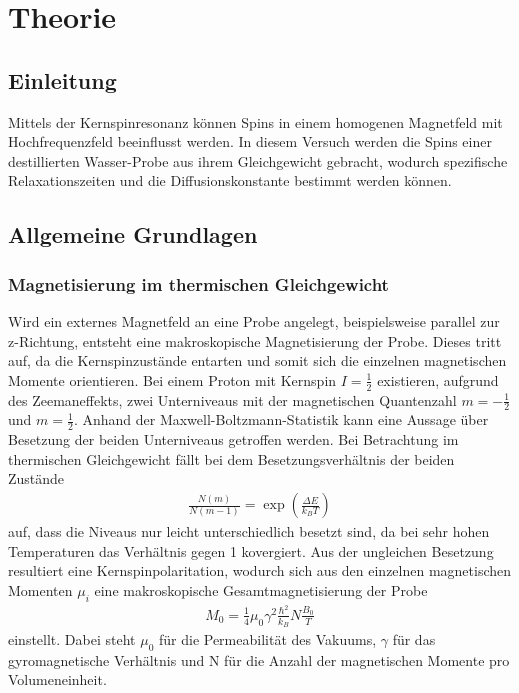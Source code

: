 \section{Theorie}
\label{sec:Theorie}
\subsection{Einleitung}
Mittels der Kernspinresonanz können Spins in einem homogenen Magnetfeld mit
Hochfrequenzfeld beeinflusst werden. In diesem Versuch werden die Spins einer 
destillierten Wasser-Probe aus ihrem Gleichgewicht gebracht, wodurch spezifische
Relaxationszeiten und die Diffusionskonstante bestimmt werden können.

\subsection{Allgemeine Grundlagen}
\subsubsection{Magnetisierung im thermischen Gleichgewicht}
Wird ein externes Magnetfeld an eine Probe angelegt, beispielsweise parallel
zur z-Richtung, entsteht eine makroskopische Magnetisierung der Probe. Dieses
tritt auf, da die Kernspinzustände entarten und somit sich die einzelnen
magnetischen Momente orientieren. Bei einem Proton mit Kernspin $I=\frac{1}{2}$
existieren, aufgrund des Zeemaneffekts, zwei Unterniveaus mit der magnetischen
Quantenzahl $m=-\frac{1}{2}$ und $m=\frac{1}{2}$. Anhand der
Maxwell-Boltzmann-Statistik kann eine Aussage über Besetzung der beiden
Unterniveaus getroffen werden. Bei Betrachtung im thermischen Gleichgewicht
fällt bei dem Besetzungsverhältnis der beiden Zustände
\begin{align}
	\frac{N(m)}{N(m-1)}=\exp{\left(\frac{\Delta E}{k_BT}\right)}
	\label{eq:verhaeltniss}
\end{align}
auf, dass die Niveaus nur leicht unterschiedlich besetzt sind, da bei sehr hohen Temperaturen das Verhältnis gegen 1 kovergiert. Aus der ungleichen Besetzung resultiert eine Kernspinpolaritation, wodurch sich aus den einzelnen magnetischen Momenten $\mu_i$ eine makroskopische Gesamtmagnetisierung der Probe
\begin{align}
	M_0 = \frac{1}{4}\mu_0\gamma^2\frac{\hbar^2}{k_B}N\frac{B_0}{T}
	\label{eq:gleichgewicht}
\end{align}
einstellt. Dabei steht $\mu_0$ für die Permeabilität des Vakuums, $\gamma$ für das gyromagnetische Verhältnis und N für die Anzahl der magnetischen Momente pro Volumeneinheit.

